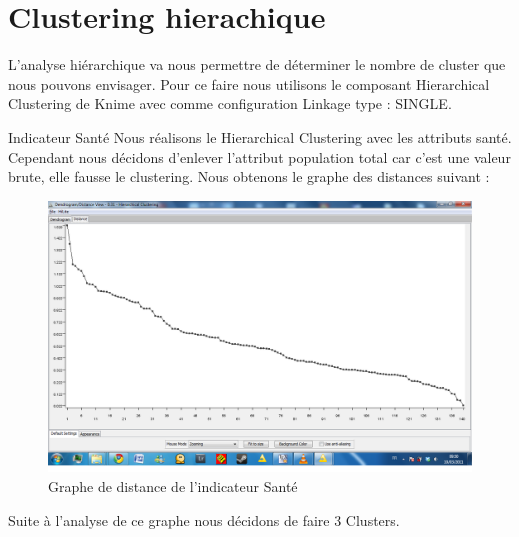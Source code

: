 \section{Clustering hierachique}
L'analyse hiérarchique va nous permettre de déterminer le nombre de cluster que nous pouvons envisager. Pour ce faire nous utilisons le composant Hierarchical Clustering de Knime avec comme configuration Linkage type : SINGLE.
\item Indicateur Santé
Nous réalisons le Hierarchical Clustering avec les attributs santé. Cependant nous décidons d'enlever l'attribut population total car c'est une valeur brute, elle fausse le clustering. Nous obtenons le graphe des distances suivant : 

\begin{figure}[H]
	\begin{center}
		\includegraphics[scale=0.5]{Image/DistanceSanteNoMissing2}
		\caption{Graphe de distance de l'indicateur Santé \jeuc}
	\end{center}
\end{figure}

Suite à l'analyse de ce graphe nous décidons de faire 3 Clusters.

